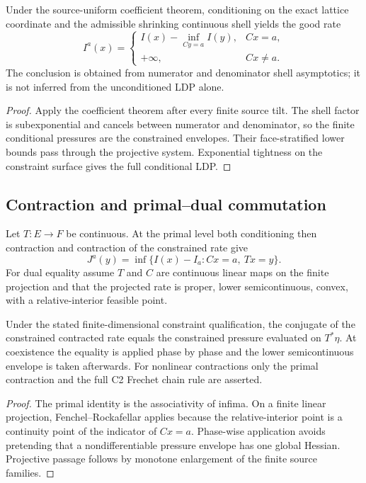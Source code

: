 \begin{theorem}
\label{thm:r7-d1-conditioning}
Under the source-uniform coefficient theorem, conditioning on the exact lattice
coordinate and the admissible shrinking continuous shell yields the good rate
\[
 I^a(x)=
 \begin{cases}
 I(x)-\inf_{Cy=a}I(y),&Cx=a,\\
 +\infty,&Cx\ne a.
 \end{cases}
\]
The conclusion is obtained from numerator and denominator shell asymptotics;
it is not inferred from the unconditioned LDP alone.
\end{theorem}

\begin{proof}
Apply the coefficient theorem after every finite source tilt.  The shell factor
is subexponential and cancels between numerator and denominator, so the finite
conditional pressures are the constrained envelopes.  Their face-stratified
lower bounds pass through the projective system.  Exponential tightness on the
constraint surface gives the full conditional LDP.
\end{proof}

\subsection{Contraction and primal--dual commutation}

Let $T:E\to F$ be continuous.  At the primal level both conditioning then
contraction and contraction of the constrained rate give
\[
 J^a(y)=\inf\{I(x)-I_a:Cx=a,\ Tx=y\}.
\]
For dual equality assume $T$ and $C$ are continuous linear maps on the finite
projection and that the projected rate is proper, lower semicontinuous, convex,
with a relative-interior feasible point.

\begin{theorem}
\label{thm:r7-d1-commutation}
Under the stated finite-dimensional constraint qualification, the conjugate of
the constrained contracted rate equals the constrained pressure evaluated on
$T^*\eta$.  At coexistence the equality is applied phase by phase and the lower
semicontinuous envelope is taken afterwards.  For nonlinear contractions only
the primal contraction and the full C2 Frechet chain rule are asserted.
\end{theorem}

\begin{proof}
The primal identity is the associativity of infima.  On a finite linear
projection, Fenchel--Rockafellar applies because the relative-interior point is
a continuity point of the indicator of $Cx=a$.  Phase-wise application avoids
pretending that a nondifferentiable pressure envelope has one global Hessian.
Projective passage follows by monotone enlargement of the finite source
families.
\end{proof}

